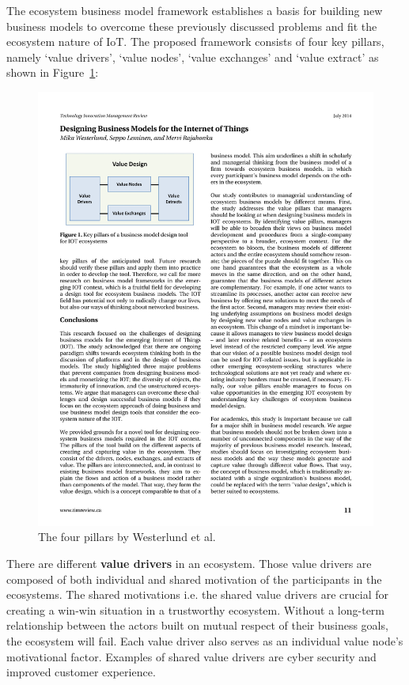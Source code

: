 		The ecosystem business model framework establishes a basis for building new business models to overcome these previously discussed problems and fit the ecosystem nature of IoT. The proposed framework consists of four key pillars, namely `value drivers', `value nodes', `value exchanges' and `value extract' as shown in Figure~\ref{Westerlund pillars}:

			\begin{figure}[ht]
			    \begin{center}
			    \includegraphics[scale=1.2]{Talk11/westerlundpillars.pdf}
			    \end{center}
			    \caption{The four pillars by Westerlund et al. \cite[p.~11]{westerlund}}
			    \label{Westerlund pillars}
			\end{figure}

		There are different \textbf{value drivers} in an ecosystem. Those value drivers are composed of both individual and shared motivation of the participants in the ecosystems. The shared motivations i.e. the shared value drivers are crucial for creating a win-win situation in a trustworthy ecosystem. Without a long-term relationship between the actors built on mutual respect of their business goals, the ecosystem will fail. Each value driver also serves as an individual value node's motivational factor. Examples of shared value drivers are cyber security and improved customer experience.

